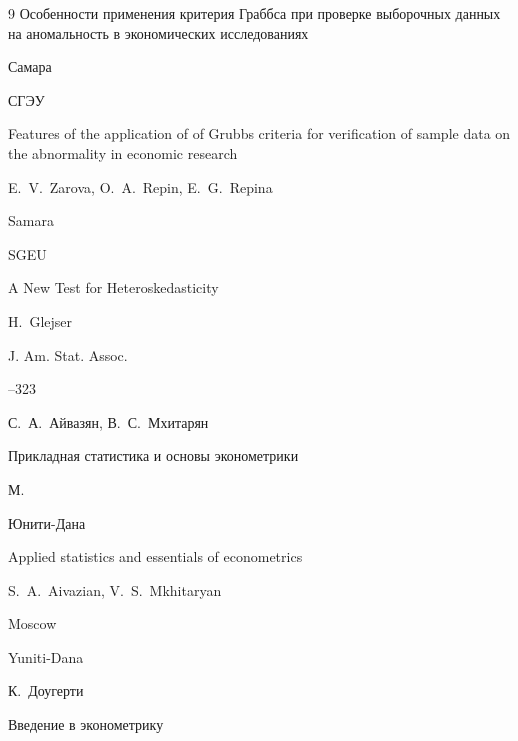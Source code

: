 \begin{thebibliography}{9}
 \book Особенности применения критерия Граббса при проверке выборочных данных на аномальность в экономических исследованиях

 \publaddr Самара

 \publ СГЭУ 



\misctransl

\book Features of the application of of Grubbs criteria for verification of sample data on the abnormality in economic research

\by E.~V.~Zarova, O.~A.~Repin, E.~G.~Repina

 \publaddr Samara

 \publ SGEU






\paper A New Test for Heteroskedasticity 

\by H.~Glejser

\jour J. Am. Stat. Assoc.




--323

 


\by С.~А.~Айвазян, В.~С.~Мхитарян

\book Прикладная статистика и основы эконометрики

\publaddr М.

\publ Юнити-Дана



\misctransl

\book Applied statistics and essentials of econometrics

\by S.~A.~Aivazian, V.~S.~Mkhitaryan

\publaddr Moscow

\publ Yuniti-Dana






\by К.~Доугерти

\book Введение в эконометрику 


\end{thebibliography}
